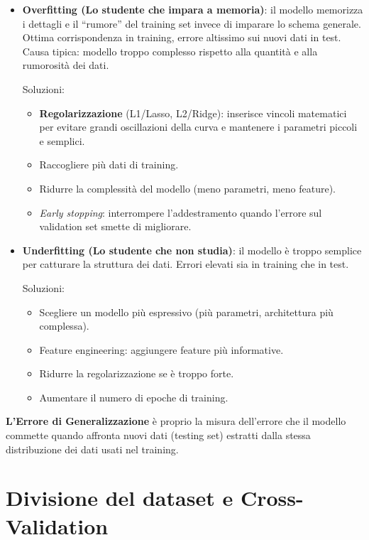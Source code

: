 \begin{itemize}
    \item \textbf{Overfitting (Lo studente che impara a memoria)}: il modello memorizza i dettagli e il ``rumore'' del training set invece di imparare lo schema generale. Ottima corrispondenza in training, errore altissimo sui nuovi dati in test. Causa tipica: modello troppo complesso rispetto alla quantità e alla rumorosità dei dati.

    Soluzioni:
    \begin{itemize}
        \item \textbf{Regolarizzazione} (L1/Lasso, L2/Ridge): inserisce vincoli matematici per evitare grandi oscillazioni della curva e mantenere i parametri piccoli e semplici.
        \item Raccogliere più dati di training.
        \item Ridurre la complessità del modello (meno parametri, meno feature).
        \item \emph{Early stopping}: interrompere l'addestramento quando l'errore sul validation set smette di migliorare.
    \end{itemize}

    \item \textbf{Underfitting (Lo studente che non studia)}: il modello è troppo semplice per catturare la struttura dei dati. Errori elevati sia in training che in test.

    Soluzioni:
    \begin{itemize}
        \item Scegliere un modello più espressivo (più parametri, architettura più complessa).
        \item Feature engineering: aggiungere feature più informative.
        \item Ridurre la regolarizzazione se è troppo forte.
        \item Aumentare il numero di epoche di training.
    \end{itemize}
\end{itemize}

\textbf{L'Errore di Generalizzazione} è proprio la misura dell'errore che il modello commette quando affronta nuovi dati (testing set) estratti dalla stessa distribuzione dei dati usati nel training.


\section{Divisione del dataset e Cross-Validation}
